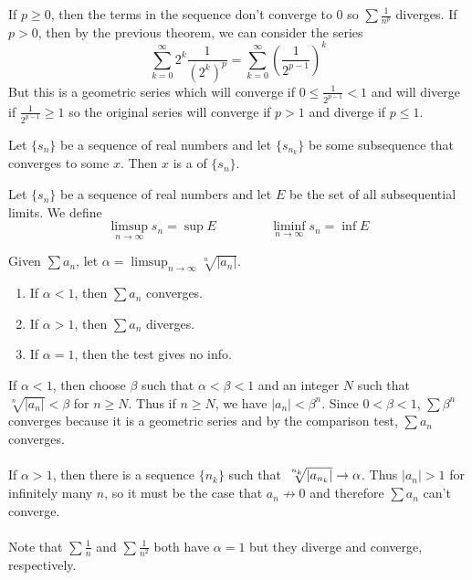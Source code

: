 \documentclass{jacky}
\begin{document}
\begin{pf}
  If $p\ge0$, then the terms in the sequence don't converge to 0 so
  $\sum\frac{1}{n^p}$ diverges. If $p>0$, then by the previous theorem, we can
  consider the series
  $$\sum_{k=0}^\infty2^k\frac{1}{(2^k)^p}
  =\sum_{k=0}^\infty(\frac{1}{2^{p-1}})^k$$
  But this is a geometric series which will converge if
  $0\le\frac{1}{2^{p-1}}<1$ and will diverge if $\frac{1}{2^{p-1}}\ge1$ so the
  original series will converge if $p>1$ and diverge if $p\le1$.
\end{pf}

\begin{defi}
  Let $\{s_n\}$ be a sequence of real numbers and let $\{s_{n_k}\}$ be some
  subsequence that converges to some $x$. Then $x$ is a  of $\{s_n\}$.
\end{defi}

\begin{defi}
  Let $\{s_n\}$ be a sequence of real numbers and let $E$ be the set of all
  subsequential limits. We define
  $$\limsup_{n\to\infty}s_n=\sup E\hspace{50pt}\liminf_{n\to\infty}s_n=\inf E$$
\end{defi}

\begin{thm}
  Given $\sum a_n$, let $\alpha=\limsup_{n\to\infty}\sqrt[n]{|a_n|}$.
  \begin{enumerate}
    \item If $\alpha<1$, then $\sum a_n$ converges.
    \item If $\alpha>1$, then $\sum a_n$ diverges.
    \item If $\alpha=1$, then the test gives no info.
  \end{enumerate}
\end{thm}

\begin{pf}
  If $\alpha<1$, then choose $\beta$ such that $\alpha<\beta<1$ and an integer
  $N$ such that $\sqrt[n]{|a_n|}<\beta$ for $n\ge N$. Thus if $n\ge N$, we have
  $|a_n|<\beta^n$. Since $0<\beta<1$, $\sum\beta^n$ converges because it is a
  geometric series and by the comparison test, $\sum a_n$ converges.\\\\
  If $\alpha>1$, then there is a sequence $\{n_k\}$ such that
  $\sqrt[\leftroot{-2}\uproot{3}n_k]{|a_{n_k}|}\to\alpha$. Thus $|a_n|>1$ for
  infinitely many $n$, so it must be the case that $a_n\not\to0$ and therefore
  $\sum a_n$ can't converge.\\\\
  Note that $\sum\frac{1}{n}$ and $\sum\frac{1}{n^2}$ both have $\alpha=1$ but
  they diverge and converge, respectively.
\end{pf}
\end{document}
